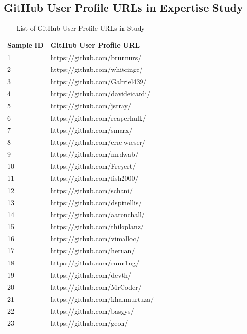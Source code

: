         
        \subsection{GitHub User Profile URLs in Expertise Study}
        
        \begin{center}
        \begin{longtable}{|p{2cm}|p{7cm}|}
        \caption{List of GitHub User Profile URLs in Study} \label{survey_GH_userURLS} \\
         \hline
        \textbf{Sample ID} & \textbf{GitHub User Profile URL} \\
         \hline
        1 & https://github.com/brunnurs/ \\
        2 & https://github.com/whiteinge/ \\
        3 & https://github.com/Gabriel439/ \\
        4 & https://github.com/davideicardi/ \\
        5 & https://github.com/jstray/ \\
        6 & https://github.com/reaperhulk/ \\
        7 & https://github.com/smarx/ \\
        8 & https://github.com/eric-wieser/ \\
        9 & https://github.com/mrdwab/ \\
        10 & https://github.com/Freyert/ \\
        11 & https://github.com/fish2000/ \\
        12 & https://github.com/schani/ \\
        13 & https://github.com/dspinellis/ \\
        14 & https://github.com/aaronchall/ \\
        15 & https://github.com/thiloplanz/ \\
        16 & https://github.com/vimalloc/ \\
        17 & https://github.com/heruan/ \\
        18 & https://github.com/runn1ng/ \\
        19 & https://github.com/devth/ \\
        20 & https://github.com/MrCoder/ \\
        21 & https://github.com/khanmurtuza/ \\
        22 & https://github.com/basgys/ \\
        23 & https://github.com/geon/ \\

\end{longtable}
\end{center}
